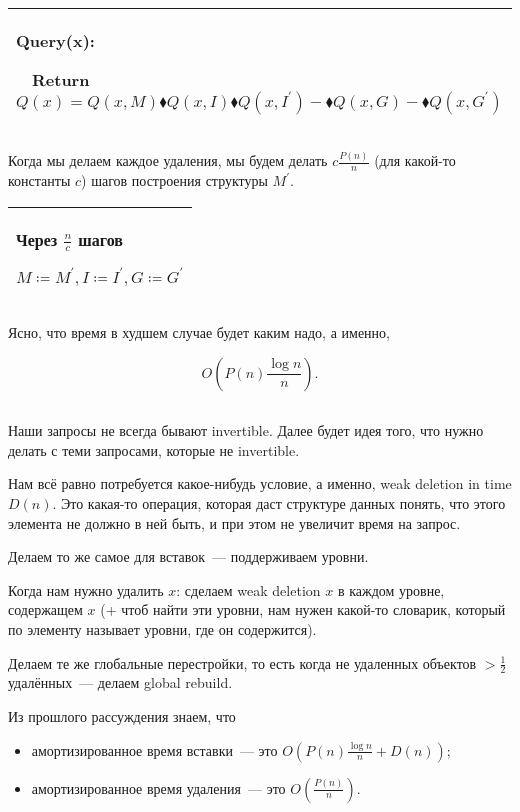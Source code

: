 \begin{tabular}{|p{11cm}|}
	\hline
	Query(x):

	$\quad$Return $Q(x) = Q(x,M)\blacklozenge Q(x,I) \blacklozenge Q(x,I^\prime) - \blacklozenge Q(x,G) - \blacklozenge Q(x,G^\prime)$ \\
	\hline
\end{tabular}


Когда мы делаем каждое удаления, мы будем делать $c\frac{P(n)}{n}$ (для какой-то константы $c$) шагов построения структуры $M^\prime$.


\begin{tabular}{|p{4cm}|}
	\hline
	Через $\frac{n}{c}$ шагов

	$M \coloneqq M^\prime,I \coloneqq I^\prime,G \coloneqq G^\prime$ \\
	\hline
\end{tabular}


Ясно, что время в худшем случае будет каким надо, а именно,

\begin{equation*}
	O\left(P(n)\frac{\log n}{n} \right).
\end{equation*}

\subsection{}

Наши запросы не всегда бывают invertible. Далее будет идея того, что нужно делать с теми запросами, которые не invertible.

Нам всё равно потребуется какое-нибудь условие, а именно, weak deletion in time $D(n)$. Это какая-то операция, которая даст структуре данных понять, что этого элемента не должно в ней быть, и при этом не увеличит время на запрос.

Делаем то же самое для вставок~--- поддерживаем уровни.

Когда нам нужно удалить $x$: сделаем weak deletion $x$ в каждом уровне, содержащем $x$ (+ чтоб найти эти уровни, нам нужен какой-то словарик, который по элементу называет уровни, где он содержится).

Делаем те же глобальные перестройки, то есть когда не удаленных объектов $ > \frac{1}{2}$ удалённых~--- делаем global rebuild.

Из прошлого рассуждения знаем, что

\begin{itemize}
	\item амортизированное время вставки~--- это $O\left(P(n)\frac{\log n}{n} + D(n)\right)$;
	\item амортизированное время удаления~--- это $O\left(\frac{P(n)}{n}\right)$.
\end{itemize}

